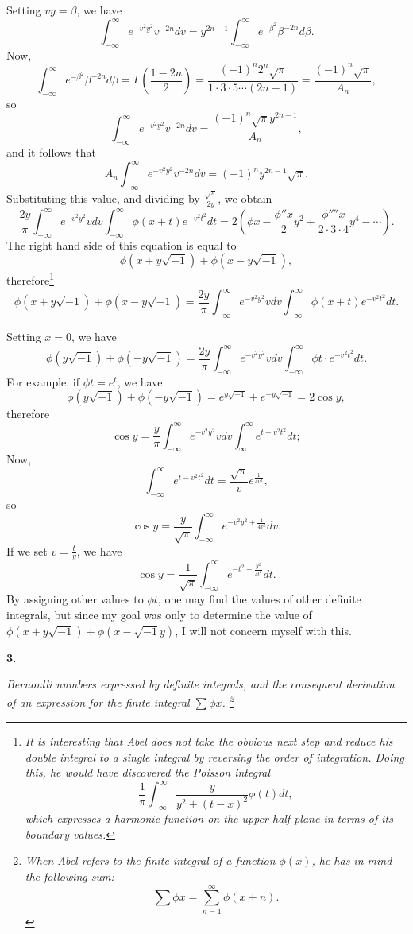 \documentclass[12pt]{article}
\begin{document}
Setting $vy = \beta$, we have 
\[ \int_{-\infty}^{\infty} e^{-v^2y^2} v^{-2n} dv = y^{2n-1} \int_{-\infty}^{\infty} e^{-\beta^2}\beta^{-2n} d\beta. \]
Now,
\[ \int_{-\infty}^{\infty} e^{-\beta^2} \beta^{-2n} d\beta = \Gamma(\frac{1-2n}{2}) = \frac{(-1)^n2^n\sqrt{\pi}}{1 \cdot 3 \cdot 5 \cdots (2n-1)} = \frac{(-1)^n\sqrt{\pi}}{A_n}, \]
so
\[ \int_{-\infty}^{\infty} e^{-v^2y^2}v^{-2n} dv = \frac{(-1)^n \sqrt{\pi} y^{2n-1}}{A_n}, \]
and it follows that 
\[ A_n \int_{-\infty}^{\infty} e^{-v^2y^2} v^{-2n} dv = (-1)^ny^{2n-1}\sqrt{\pi}. \]
Substituting this value, and dividing by $\frac{\sqrt{\pi}}{2y}$, we obtain
\[ \frac{2y}{\pi} \int_{-\infty}^{\infty} e^{-v^2y^2}vdv \int_{-\infty}^{\infty} \phi(x+t) e^{-v^2t^2}dt = 2 \left(\phi x - \frac{\phi''x}{2} y^2 + \frac{\phi'''' x}{2 \cdot 3 \cdot 4} y^4 - \cdots \right). \]
The right hand side of this equation is equal to 
\[ \phi(x+y\sqrt{-1}) + \phi(x-y\sqrt{-1}), \]
therefore\footnote{\emph{It is interesting that Abel does not take the obvious next step and reduce his double integral to a single integral by reversing the order of integration.  Doing this, he would have discovered the Poisson integral
\[ \frac{1}{\pi} \int_{-\infty}^{\infty} \frac{y}{y^2 + (t-x)^2} \phi(t) dt, \]
which expresses a harmonic function on the upper half plane in terms of its boundary values.}}
\[ \phi(x+y\sqrt{-1}) + \phi(x-y\sqrt{-1}) = \frac{2y}{\pi} \int_{-\infty}^{\infty} e^{-v^2y^2}vdv \int_{-\infty}^{\infty} \phi(x+t) e^{-v^2t^2}dt. \]

Setting $x=0$, we have 
\[ \phi(y \sqrt{-1}) + \phi(-y\sqrt{-1}) = \frac{2y}{\pi} \int_{-\infty}^{\infty} e^{-v^2y^2}vdv \int_{-\infty}^{\infty} \phi t \cdot e^{-v^2t^2} dt . \]
For example, if $\phi t = e^t$, we have 
\[ \phi(y \sqrt{-1}) + \phi(-y\sqrt{-1}) = e^{y \sqrt{-1}} + e^{-y\sqrt{-1}} = 2 \cos y, \]
therefore
\[ \cos y = \frac{y}{\pi} \int_{-\infty}^{\infty} e^{-v^2y^2}vdv \int_{\infty}^{\infty} e^{t-v^2t^2}dt ;\]
Now,
\[ \int_{-\infty}^{\infty} e^{t-v^2t^2}dt = \frac{\sqrt{\pi}}{v} e^{\frac{1}{4v^2}}, \]
so
\[ \cos y = \frac{y}{\sqrt{\pi}} \int_{-\infty}^{\infty} e^{-v^2y^2 + \frac{1}{4v^2}} dv . \]
If we set $v=\frac{t}{y}$, we have 
\[ \cos y = \frac{1}{\sqrt{\pi}} \int_{-\infty}^{\infty} e^{-t^2 + \frac{y^2}{4 t^2}} dt . \]
By assigning other values to $\phi t$, one may find the values of other definite integrals, but since my goal was only to determine the value of $\phi(x+y\sqrt{-1}) + \phi(x-\sqrt{-1} y)$, I will not concern myself with this.

\pagebreak
\begin{center}
\textbf{3.}

\emph{Bernoulli numbers expressed by definite integrals, and the consequent derivation of an expression for the finite integral $\sum \phi x$. \footnote{\emph{When Abel refers to the \emph{finite integral} of a function $\phi(x)$, he has in mind the following sum:
\[ \sum \phi x = \sum_{n=1}^{\infty} \phi(x+n). \]
}}}
\end{center}
\end{document}
